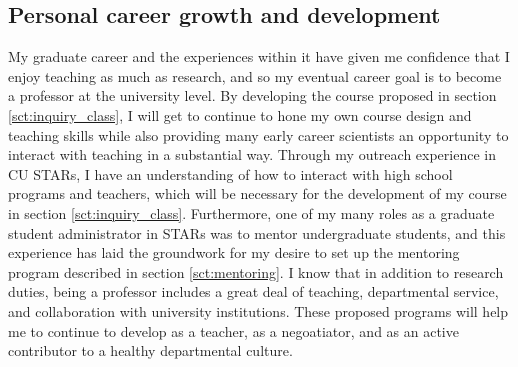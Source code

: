 \documentclass[aasms,11pt, longbibliography]{article}
\begin{document}
\subsection{Personal career growth and development}
\label{sct:personal_growth}
My graduate career and the experiences within it have given me confidence that I enjoy teaching as much as research, and so my eventual career goal is to become a professor at the university level.
By developing the course proposed in section \ref{sct:inquiry_class}, I will get to continue to hone my own course design and teaching skills while also providing many early career scientists an opportunity to interact with teaching in a substantial way.
Through my outreach experience in CU STARs, I have an understanding of how to interact with high school programs and teachers, which will be necessary for the development of my course in section \ref{sct:inquiry_class}.
Furthermore, one of my many roles as a graduate student administrator in STARs was to mentor undergraduate students, and this experience has laid the groundwork for my desire to set up the mentoring program described in section \ref{sct:mentoring}.
I know that in addition to research duties, being a professor includes a great deal of teaching, departmental service, and collaboration with university institutions.
These proposed programs will help me to continue to develop as a teacher, as a negoatiator, and as an active contributor to a healthy departmental culture.
\end{document}

